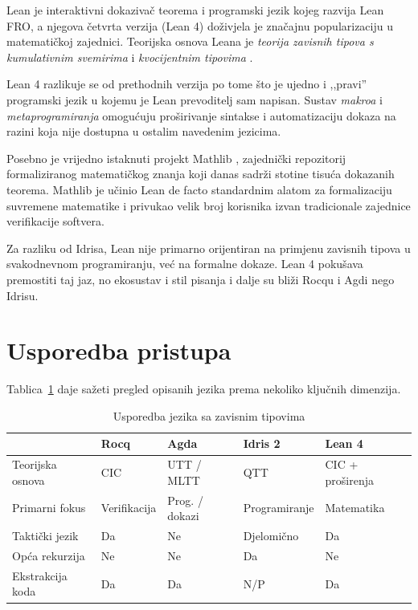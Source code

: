 \documentclass[diplomskirad,upload]{fer}
\begin{document}
Lean \cite{lean} je interaktivni dokazivač teorema i programski jezik
kojeg razvija Lean FRO, a njegova četvrta verzija (Lean 4) doživjela
je značajnu popularizaciju u matematičkoj zajednici. Teorijska osnova Leana je
\emph{teorija zavisnih tipova s kumulativnim svemirima} i \emph{kvocijentnim
tipovima} .

Lean 4 razlikuje se od prethodnih verzija po tome što je ujedno i ,,pravi''
programski jezik u kojemu je Lean prevoditelj sam napisan. Sustav
\emph{makroa}  i \emph{metaprogramiranja} 
omogućuju proširivanje sintakse i automatizaciju dokaza na razini koja nije
dostupna u ostalim navedenim jezicima.

Posebno je vrijedno istaknuti projekt Mathlib \cite{mathlib2020}, zajednički
repozitorij formaliziranog matematičkog znanja koji danas sadrži stotine tisuća
dokazanih teorema. Mathlib je učinio Lean de facto standardnim alatom za
formalizaciju suvremene matematike i privukao velik broj korisnika izvan
tradicionale zajednice verifikacije softvera.

Za razliku od Idrisa, Lean nije primarno orijentiran na primjenu zavisnih
tipova u svakodnevnom programiranju, već na formalne dokaze. Lean 4 pokušava
premostiti taj jaz, no ekosustav i stil pisanja i dalje su bliži Rocqu i Agdi
nego Idrisu.

\section{Usporedba pristupa}

Tablica~\ref{tab:usporedba-jezika} daje sažeti pregled opisanih jezika prema
nekoliko ključnih dimenzija.

\begin{table}[hbt]
\centering
\begin{tabular}{|l|l|l|l|l|}
\hline
 & \textbf{Rocq} & \textbf{Agda} & \textbf{Idris 2} & \textbf{Lean 4} \\
\hline
Teorijska osnova   & CIC          & UTT / MLTT     & QTT          & CIC + proširenja \\
Primarni fokus     & Verifikacija & Prog. / dokazi & Programiranje & Matematika \\
Taktički jezik     & Da           & Ne             & Djelomično   & Da \\
Opća rekurzija     & Ne           & Ne             & Da           & Ne \\
Ekstrakcija koda   & Da           & Da             & N/P          & Da \\
\hline
\end{tabular}
\caption{Usporedba jezika sa zavisnim tipovima}
\label{tab:usporedba-jezika}
\end{table}
\end{document}
